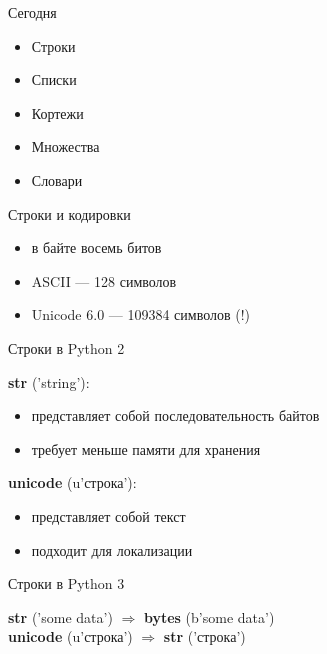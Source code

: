 \documentclass[hyperref={pdftex,unicode}]{beamer}
\begin{document}
\begin{frame}
  \maketitle
\end{frame}

\begin{frame}{Сегодня}
  \begin{itemize}
  \item Строки
  \item Списки
  \item Кортежи
  \item Множества
  \item Словари
  \end{itemize}
\end{frame}

\begin{frame}{Строки и кодировки}
  \begin{itemize}
    \item в байте восемь битов
    \item ASCII --- 128 символов
    \item Unicode 6.0 --- 109384 символов (!)
  \end{itemize}
\end{frame}

\begin{frame}{Строки в Python 2}
  \begin{minipage}{0.55\linewidth}
    \textbf{str} ('string'):
    \begin{itemize}
    \item представляет собой последовательность байтов
    \item требует меньше памяти для хранения
    \end{itemize}
  \end{minipage}
  \hfill
  \begin{minipage}{0.4\linewidth}
    \textbf{unicode} (u'строка'):
    \begin{itemize}
    \item представляет собой текст
    \item подходит для локализации
    \end{itemize}
  \end{minipage}
\end{frame}

\begin{frame}{Строки в Python 3}
  \begin{center}
    \textbf{str} ('some data') $ \Rightarrow $ \textbf{bytes} (b'some data') \\
    \vspace{1em}
    \textbf{unicode} (u'строка') $ \Rightarrow $ \textbf{str} ('строка')
  \end{center}
\end{frame}
\end{document}
